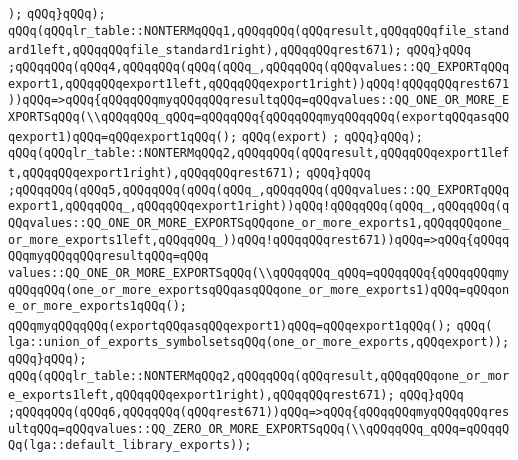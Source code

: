 \verb|);|\newline
\verb|qQQq}qQQq);|\newline
\verb|qQQq(qQQqlr_table::NONTERMqQQq1,qQQqqQQq(qQQqresult,qQQqqQQqfile_standard1left,qQQqqQQqfile_standard1right),qQQqqQQqrest671);|\newline
\verb|qQQq}qQQq|\newline
\verb|;qQQqqQQq(qQQq4,qQQqqQQq(qQQq(qQQq_,qQQqqQQq(qQQqvalues::QQ_EXPORTqQQqexport1,qQQqqQQqexport1left,qQQqqQQqexport1right))qQQq!qQQqqQQqrest671))qQQq=>qQQq{qQQqqQQqmyqQQqqQQqresultqQQq=qQQqvalues::QQ_ONE_OR_MORE_EXPORTSqQQq(\\qQQqqQQq_qQQq=qQQqqQQq{qQQqqQQqmyqQQqqQQq(exportqQQqasqQQqexport1)qQQq=qQQqexport1qQQq();|\newline
\verb|qQQq(export)|\newline
\verb|;|\newline
\verb|qQQq}qQQq);|\newline
\verb|qQQq(qQQqlr_table::NONTERMqQQq2,qQQqqQQq(qQQqresult,qQQqqQQqexport1left,qQQqqQQqexport1right),qQQqqQQqrest671);|\newline
\verb|qQQq}qQQq|\newline
\verb|;qQQqqQQq(qQQq5,qQQqqQQq(qQQq(qQQq_,qQQqqQQq(qQQqvalues::QQ_EXPORTqQQqexport1,qQQqqQQq_,qQQqqQQqexport1right))qQQq!qQQqqQQq(qQQq_,qQQqqQQq(qQQqvalues::QQ_ONE_OR_MORE_EXPORTSqQQqone_or_more_exports1,qQQqqQQqone_or_more_exports1left,qQQqqQQq_))qQQq!qQQqqQQqrest671))qQQq=>qQQq{qQQqqQQqmyqQQqqQQqresultqQQq=qQQq|\newline
\verb|values::QQ_ONE_OR_MORE_EXPORTSqQQq(\\qQQqqQQq_qQQq=qQQqqQQq{qQQqqQQqmyqQQqqQQq(one_or_more_exportsqQQqasqQQqone_or_more_exports1)qQQq=qQQqone_or_more_exports1qQQq();|\newline
\verb|qQQqmyqQQqqQQq(exportqQQqasqQQqexport1)qQQq=qQQqexport1qQQq();|\newline
\verb|qQQq(|\newline
\verb|lga::union_of_exports_symbolsetsqQQq(one_or_more_exports,qQQqexport));|\newline
\verb|qQQq}qQQq);|\newline
\verb|qQQq(qQQqlr_table::NONTERMqQQq2,qQQqqQQq(qQQqresult,qQQqqQQqone_or_more_exports1left,qQQqqQQqexport1right),qQQqqQQqrest671);|\newline
\verb|qQQq}qQQq|\newline
\verb|;qQQqqQQq(qQQq6,qQQqqQQq(qQQqrest671))qQQq=>qQQq{qQQqqQQqmyqQQqqQQqresultqQQq=qQQqvalues::QQ_ZERO_OR_MORE_EXPORTSqQQq(\\qQQqqQQq_qQQq=qQQqqQQq(lga::default_library_exports));|\newline

